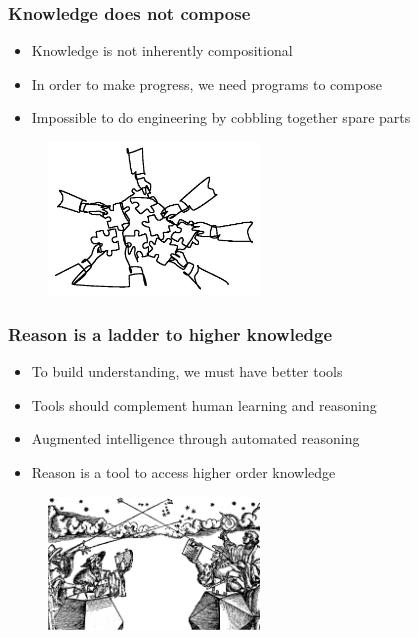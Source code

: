 \documentclass{beamer}
\begin{document}
    \begin{frame}
        \frametitle{Knowledge does not compose}
        \begin{itemize}
            \item Knowledge is not inherently compositional
            \item In order to make progress, we need programs to compose
            \item Impossible to do engineering by cobbling together spare parts
        \end{itemize}
        \begin{figure}[H]
            \centering
            \includegraphics[width=0.5\textwidth]{../clipart/compositionality.jpeg}
        \end{figure}
    \end{frame}


    \begin{frame}
        \frametitle{Reason is a ladder to higher knowledge}
        \begin{itemize}
            \item To build understanding, we must have better tools
            \item Tools should complement human learning and reasoning
            \item Augmented intelligence through automated reasoning
            \item Reason is a tool to access higher order knowledge
        \end{itemize}
        \begin{figure}[H]
            \centering
            \includegraphics[width=0.5\textwidth]{../clipart/astronomers.png}
        \end{figure}
    \end{frame}
\end{document}
